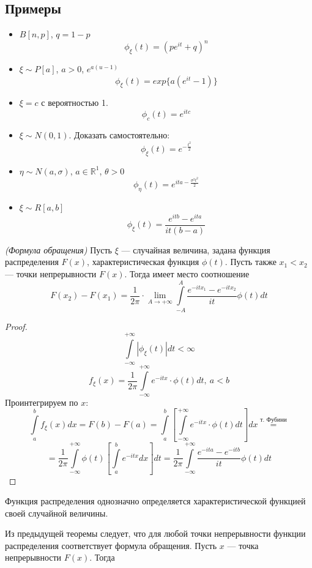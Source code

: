 \begin{enumerate}[wide, labelwidth=!, labelindent=0pt]
\subsection{Примеры}
\begin{itemize}
	\item $B [n, p]$, $q = 1 - p$
\[
	\phi_{\xi} (t) = (pe^{it} + q)^n
\]
	\item $\xi \sim P [a]$, $a > 0$, $e^{a(u - 1)}$
\[
	\phi_{\xi} (t) = exp \{ a(e^{it} - 1) \}
\]
    \item $\xi = c$ с вероятностью 1.
\[
	\phi_c (t) = e^{itc}
\] 
	\item $\xi \sim N(0, 1)$. Доказать самостоятельно:
\[
	\phi_{\xi} (t) = e^{- \frac{t^2}{2}}
\]
\item $\eta \sim N(a, \sigma)$, $a \in \mathbb{R}^1$, $\theta > 0$
\[
	\phi_{\eta} (t) = e^{{ita} - \frac{\sigma^2 t^2}{2}}
\]
\item $\xi \sim R [a, b]$
\[
	\phi_{\xi} (t) = \frac{e^{i t b} - e^{i t a}}{it(b - a)}
\]
\end{itemize}
\begin{theorem}
	\textit{(Формула обращения)} Пусть $\xi$ --- случайная величина, задана функция распределения $F(x)$, характеристическая функция $\phi(t)$. Пусть также $x_1 < x_2$ --- точки непрерывности $F(x)$. Тогда имеет место соотношение
\[
	F(x_2) - F(x_1) = \frac{1}{2 \pi} \cdot \lim\limits_{A \to + \infty} \int\limits_{-A}^{A} \frac{e^{-it x_1} - e^{-it x_2}}{it} \phi(t) dt
\]
\end{theorem}
\begin{proof}
\[
	\int\limits_{-\infty}^{+\infty} | \phi_{\xi} (t) | dt < \infty
\]
\[
	f_{\xi} (x) = \frac{1}{2 \pi} \int\limits_{-\infty}^{+\infty} e^{-it x} \cdot \phi(t) dt, \ a < b
\]
Проинтегрируем по $x$:
\[
	\int\limits_{a}^{b} f_{\xi} (x) dx = F(b) - F(a) = \int\limits_{a}^{b} \left[ \int\limits_{-\infty}^{+\infty} e^{-itx} \cdot \phi(t) dt \right] dx \overset{\text{т. Фубини}}{=}
\]
\[
	= \frac{1}{2 \pi} \int\limits_{-\infty}^{+\infty} \phi(t) \left[ \int\limits_{a}^{b} e^{-itx} dx \right] dt = \frac{1}{2 \pi} \int\limits_{-\infty}^{+\infty} \frac{e^{-ita} - e^{-itb}}{it} \phi(t) dt
\]
\end{proof}
\begin{theorem}
	Функция распределения однозначно определяется характеристической функцией своей случайной величины. 
\end{theorem}
Из предыдущей теоремы следует, что для любой точки непрерывности функции распределения соответствует формула обращения. Пусть $x$ --- точка непрерывности $F(x)$. Тогда

\end{enumerate}
